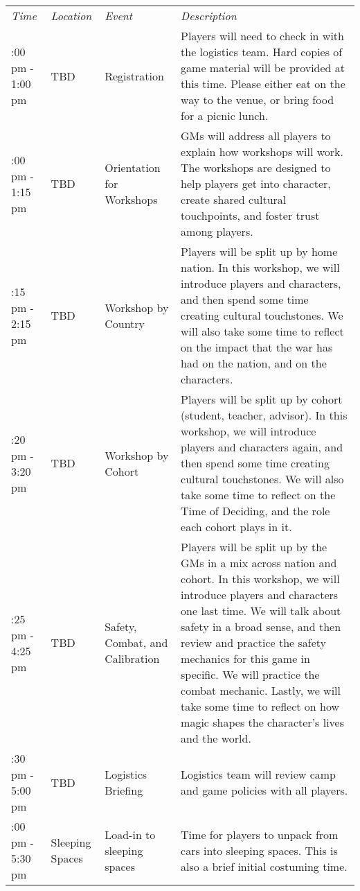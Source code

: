 \documentclass[green]{GL2020}
\begin{document}
\begin{tabularx}{\textwidth}{|>{\centering\arraybackslash} m{1.5cm} | >{\centering\arraybackslash} m{1.5cm} | >{\centering\arraybackslash} m{1.8cm} | >{\centering\arraybackslash}X |}
 \hline
\multicolumn{4}{|c|}{\textbf{Friday (Mandatory Pre-Game Activities) 12:00 pm}} \\
\hline 
 \emph{Time} & \emph{Location} & \emph{Event} & \emph{Description}\\
\hline
 12:00 pm - 1:00 pm   & TBD & Registration &  Players will need to check in with the logistics team. Hard copies of game material will be provided at this time. Please either eat on the way to the venue, or bring food for a picnic lunch. \\
    \hline
  1:00 pm - 1:15 pm  & TBD & Orientation for Workshops & GMs will address all players to explain how workshops will work. The workshops are designed to help players get into character, create shared cultural touchpoints, and foster trust among players. \\
    \hline
  1:15 pm - 2:15 pm & TBD & Workshop by Country & Players will be split up by home nation. In this workshop, we will introduce players and characters, and then spend some time creating cultural touchstones. We will also take some time to reflect on the impact that the war has had on the nation, and on the characters.  \\
    \hline
  2:20 pm - 3:20 pm & TBD & Workshop by Cohort & Players will be split up by cohort (student, teacher, advisor). In this workshop, we will introduce players and characters again, and then spend some time creating cultural touchstones. We will also take some time to reflect on the Time of Deciding, and the role each cohort plays in it. \\
 \hline
  3:25 pm - 4:25 pm & TBD & Safety, Combat, and Calibration & Players will be split up by the GMs in a mix across nation and cohort. In this workshop, we will introduce players and characters one last time. We will talk about safety in a broad sense, and then review and practice the safety mechanics for this game in specific. We will practice the combat mechanic. Lastly, we will take some time to reflect on how magic shapes the character’s lives and the world. \\
 \hline
  4:30 pm - 5:00 pm & TBD  & Logistics Briefing & Logistics team will review camp and game policies with all players. \\
 \hline
 5:00 pm - 5:30 pm & Sleeping Spaces  & Load-in to sleeping spaces & Time for players to unpack from cars into sleeping spaces. This is also a brief initial costuming time. \\

\end{tabularx}
\end{document}
